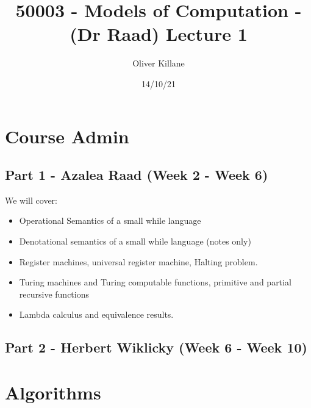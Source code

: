 \documentclass{report}
\title{50003 - Models of Computation - (Dr Raad) Lecture 1}
\author{Oliver Killane}
\date{14/10/21}
\begin{document}
\maketitle
{}

\section*{Course Admin}
\subsection*{Part 1 - Azalea Raad (Week 2 - Week 6)}
\begin{itemize}
\end{itemize}
We will cover:
\begin{itemize}
	\item Operational Semantics of a small while language
	\item Denotational semantics of a small while language (notes only)
	\item Register machines, universal register machine, Halting problem.
	\item Turing machines and Turing computable functions, primitive and partial recursive functions
	\item Lambda calculus and equivalence results.
\end{itemize}
\subsection*{Part 2 - Herbert Wiklicky (Week 6 - Week 10)}
\begin{itemize}
\end{itemize}
\section*{Algorithms}
\end{document}
